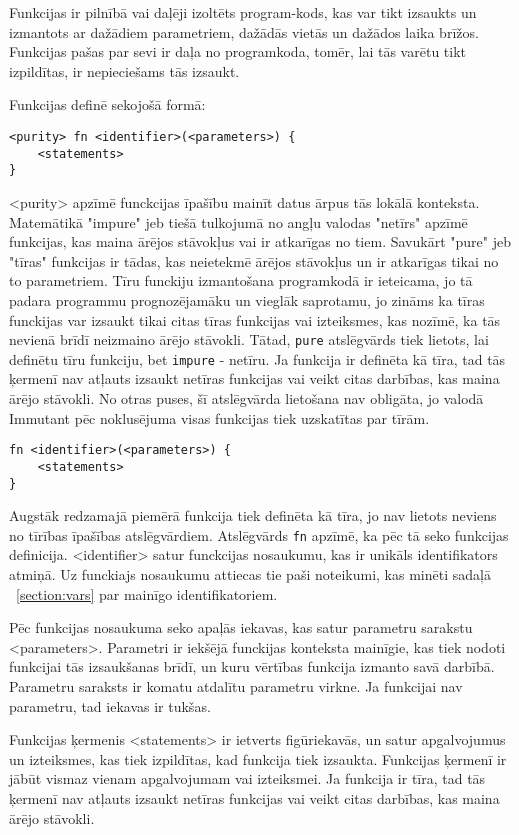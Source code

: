 \documentclass[12pt,a4paper]{report}
\begin{document}
Funkcijas ir pilnībā vai daļēji izoltēts program-kods, kas var tikt izsaukts un izmantots ar dažādiem parametriem, dažādās vietās un dažādos laika brīžos. Funkcijas pašas par sevi ir daļa no programkoda, tomēr, lai tās varētu tikt izpildītas, ir nepieciešams tās izsaukt. 

Funkcijas definē sekojošā formā:
\begin{verbatim}
<purity> fn <identifier>(<parameters>) {
    <statements>
}
\end{verbatim}

<purity> apzīmē funckcijas īpašību mainīt datus ārpus tās lokālā konteksta. Matemātikā "impure" jeb tiešā tulkojumā no angļu valodas "netīrs" apzīmē funkcijas, kas maina ārējos stāvokļus vai ir atkarīgas no tiem. Savukārt "pure" jeb "tīras" funkcijas ir tādas, kas neietekmē ārējos stāvokļus un ir atkarīgas tikai no to parametriem. Tīru funckiju izmantošana programkodā ir ieteicama, jo tā padara programmu prognozējamāku un vieglāk saprotamu, jo zināms ka tīras funckijas var izsaukt tikai citas tīras funkcijas vai izteiksmes, kas nozīmē, ka tās nevienā brīdī neizmaino ārējo stāvokli. Tātad, \texttt{pure} atslēgvārds tiek lietots, lai definētu tīru funkciju, bet \texttt{impure} - netīru. Ja funkcija ir definēta kā tīra, tad tās ķermenī nav atļauts izsaukt netīras funkcijas vai veikt citas darbības, kas maina ārējo stāvokli. No otras puses, šī atslēgvārda lietošana nav obligāta, jo valodā Immutant pēc noklusējuma visas funkcijas tiek uzskatītas par tīrām.

\begin{verbatim}
fn <identifier>(<parameters>) {
    <statements>
}
\end{verbatim}

Augstāk redzamajā piemērā funkcija tiek definēta kā tīra, jo nav lietots neviens no tīrības īpašības atslēgvārdiem. Atslēgvārds \texttt{fn} apzīmē, ka pēc tā seko funkcijas definicija. <identifier> satur funckcijas nosaukumu, kas ir unikāls identifikators atmiņā. Uz funckiajs nosaukumu attiecas tie paši noteikumi, kas minēti sadaļā ~\ref{section:vars} par mainīgo identifikatoriem.

Pēc funkcijas nosaukuma seko apaļās iekavas, kas satur parametru sarakstu <parameters>. Parametri ir iekšējā funckijas konteksta mainīgie, kas tiek nodoti funkcijai tās izsaukšanas brīdī, un kuru vērtības funkcija izmanto savā darbībā. Parametru saraksts ir komatu atdalītu parametru virkne. Ja funkcijai nav parametru, tad iekavas ir tukšas.

Funkcijas ķermenis <statements> ir ietverts figūriekavās, un satur apgalvojumus un izteiksmes, kas tiek izpildītas, kad funkcija tiek izsaukta. Funkcijas ķermenī ir jābūt vismaz vienam apgalvojumam vai izteiksmei. Ja funkcija ir tīra, tad tās ķermenī nav atļauts izsaukt netīras funkcijas vai veikt citas darbības, kas maina ārējo stāvokli.
\end{document}
